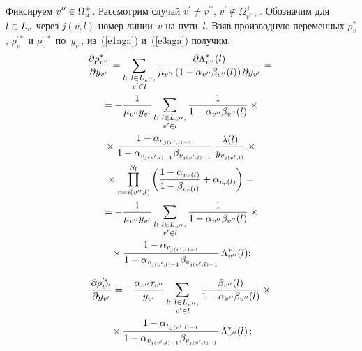 \begin{multicols}{2}
   Фиксируем $v^{\prime\prime}\hm\in\Omega_u^+$. Рассмотрим случай 
$v^\prime\not= v^{\prime\prime}$, $v^\prime\not\in\Omega^+_{v^{\prime\prime +}}$. 
Обозначим для $l\hm\in L_v$ через $j(v,l)$ номер линии~$v$ на пути~$l$. 
Взяв производную переменных $\rho_v^*$, $\rho_v^{\prime *}$ и
$\rho_v^{\prime\prime *}$ по~$y_{v^\prime}$, из~(\ref{e1aga}) и~(\ref{e3aga}) 
получим: 
   \begin{multline*}
   \displaystyle\frac{\displaystyle \partial \rho^*_{ v^{\prime\prime}}\mathstrut}{\displaystyle \partial 
y_{v^\prime}\mathstrut}=\sum\limits_{\substack{{l:\ l\in L_{ v^{\prime\prime}},}\\ {v^\prime\in l}}} 
\displaystyle\frac{\displaystyle \partial \Lambda^*_{ v^{\prime\prime}}(l)\mathstrut}{\displaystyle \mu_{ v^{\prime\prime}}\left(1-\alpha_{ v^{\prime\prime}}\beta_{ 
v^{\prime\prime}}(l)\right)\partial y_{v^\prime}\mathstrut}={}\\
   {}=
   -\displaystyle\frac{\displaystyle 1\mathstrut}{\displaystyle \mu_{ v^{\prime\prime}} y_{v^\prime}\mathstrut} 
   \sum\limits_{\substack{{l:\ l\in L_{ v^{\prime\prime}},}\\ {v^\prime\in l}}} 
   \displaystyle\frac{\displaystyle 1\mathstrut}{\displaystyle 1-\alpha_{ v^{\prime\prime}} \beta_{v^{\prime\prime}}(l)\mathstrut}\times{}\\
{}\times\displaystyle\frac{\displaystyle 1-\alpha_{v_{j(v^\prime,l)-1}}\mathstrut}{\displaystyle 1-
\alpha_{v_{j(v^\prime,l)-1}}\beta_{ v_{j(v^\prime,l)-1}}\mathstrut}\, 
\displaystyle\frac{\displaystyle \lambda(l)\mathstrut}{\displaystyle y_{ 
v_{j(v^\prime,l)}}\mathstrut} \times{}\\
{}\times
\prod\limits_{r=i(v^{\prime\prime},l)}^{S_l}\left(
   \displaystyle\frac{\displaystyle 1-\alpha_{v_r(l)}\mathstrut}{\displaystyle 1-\beta_{v_r(l)}\mathstrut}+\alpha_{v_r(l)}\right)={}\\
   {}=
    -\displaystyle\frac{\displaystyle 1\mathstrut}{\displaystyle \mu_{v^{\prime\prime}}y_{v^\prime}\mathstrut}
\sum\limits_{\substack{{l:\ l\in L_{ v^{\prime\prime}},}\\ {v^\prime\in l}}}
      \displaystyle\frac{\displaystyle 1\mathstrut}{\displaystyle 1-\alpha_{ v^{\prime\prime}}\beta_{ v^{\prime\prime}}(l)\mathstrut}\times{}\\
      {}\times
      \displaystyle\frac{\displaystyle 1-\alpha_{ v_{j(v^\prime,l)-1}}\mathstrut}{\displaystyle 1-\alpha_{ v_{j(v^\prime,l)-
1}}\beta_{v_{j(v^\prime,l)-1}}\mathstrut}\, \Lambda^*_{ v^{\prime\prime}}(l);
      \end{multline*}
      
      \vspace*{-9pt}
      
      \noindent
  \begin{multline*}
      \displaystyle\frac{\displaystyle \partial \rho_{v^{\prime\prime}}^{\prime *} \mathstrut}{\displaystyle \partial y_{v^\prime}\mathstrut} =-\displaystyle\frac{\displaystyle \alpha_{v^{\prime\prime}}\tau_{v^{\prime\prime}}\mathstrut}{\displaystyle y_{v^\prime}\mathstrut}
      \sum\limits_{\substack{{l:\ l\in L_{ v^{\prime\prime}},}\\ {v^\prime\in l}}}  
      \displaystyle\frac{\displaystyle \beta_{ v^{\prime\prime}}(l)\mathstrut}{\displaystyle 1-\alpha_{ v^{\prime\prime}}\beta_{ 
v^{\prime\prime}}(l)\mathstrut}\times{}\\
{}\times
      \displaystyle\frac{\displaystyle 1-\alpha_{ v_{j(v^\prime,l)-1}}\mathstrut}{\displaystyle 1-\alpha_{ v_{j(v^\prime,l)-
1}}\beta_{v_{j(v^\prime,l)-1}}\mathstrut}\, \Lambda^*_{ v^{\prime\prime}}(l)\,;
     \end{multline*}
     

\end{multicols}
